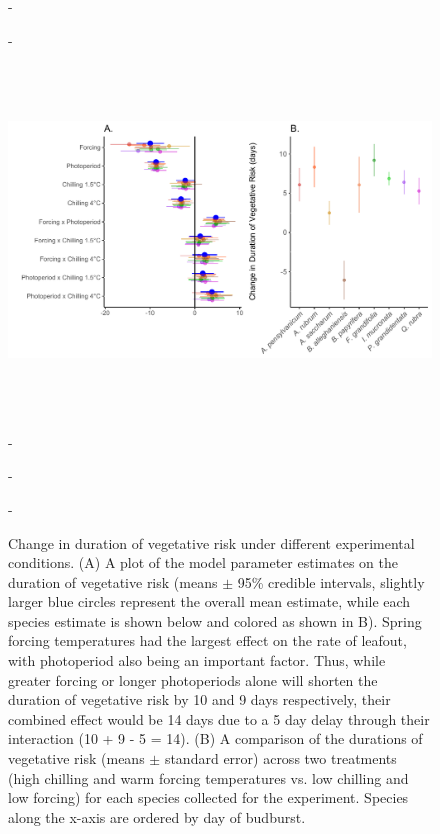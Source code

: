 \documentclass{article}\usepackage[]{graphicx}\usepackage[]{color}
\begin{document}
\begin{figure} [H] 
 -\begin{center}
 -\includegraphics[width=16cm, height=10cm]{..//figure/DVR_diffplots_nophoto.pdf} 
 -\caption{Change in duration of vegetative risk under different experimental conditions. (A) A plot of the model parameter estimates on the duration of vegetative risk (means $\pm$ 95\% credible intervals, slightly larger blue circles represent the overall mean estimate, while each species estimate is shown below and colored as shown in B). Spring forcing temperatures had the largest effect on the rate of leafout, with photoperiod also being an important factor. Thus, while greater forcing or longer photoperiods alone will shorten the duration of vegetative risk by 10 and 9 days respectively, their combined effect would be 14 days due to a 5 day delay through their interaction (10 + 9 - 5 = 14). (B) A comparison of the durations of vegetative risk (means $\pm$ standard error) across two treatments (high chilling and warm forcing temperatures vs. low chilling and low forcing) for each species collected for the experiment. Species along the x-axis are ordered by day of budburst.}\label{fig:dan} 
 -\end{center}
 -\end{figure}
\end{document}
